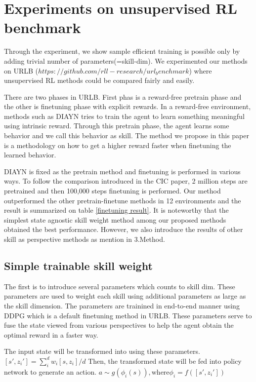 \section{Experiments on unsupervised RL benchmark} 

Through the experiment, we show sample efficient training is possible only by adding trivial number of parameters(=skill-dim).
We experimented our methods on URLB ($https://github.com/rll-research/url_benchmark$) where unsupervised RL methods could be compared fairly and easily.

There are two phases in URLB.
First phas is a reward-free pretrain phase and the other is finetuning phase with explicit rewards.
In a reward-free environment, methods such as DIAYN tries to train the agent to learn something meaningful using intrinsic reward.
Through this pretrain phase, the agent learns some behavior and we call this behavior as skill.
The method we propose in this paper is a methodology on how to get a higher reward faster when finetuning the learned behavior.

DIAYN is fixed as the pretrain method and finetuning is performed in various ways.
To follow the comparison introduced in the CIC paper, 2 million steps are pretrained and then 100,000 steps finetuning is performed.
Our method outperformed the other pretrain-finetune methods in 12 environments and the result is summarized on table \cref{finetuning result}.
It is noteworthy that the simplest state agnostic skill weight method among our proposed methods obtained the best performance. 
However, we also introduce the results of other skill as perspective methods as mention in 3.Method.

\subsection{Simple trainable skill weight}
The first is to introduce several parameters which counts to skill dim.
These parameters are used to weight each skill using additional parameters as large as the skill dimension.
The parameters are trainined in end-to-end manner using DDPG which is a default finetuning method in URLB.
These parameters serve to fuse the state viewed from various perspectives to help the agent obtain the optimal reward in a faster way.

The input state will be transformed into using these parameters. 
$[s',z_i'] = \sum_{i}^{d}w_i [s,z_i]/d$
Then, the transformed state will be fed into policy network to generate an action.
$a \sim g(\phi_i(s)), \text{where} \phi_i=f([s',z_i'])$

